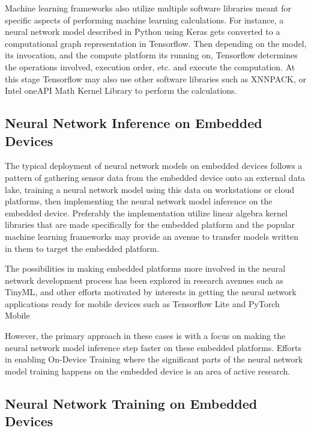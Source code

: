 Machine learning frameworks also utilize multiple software libraries meant for specific aspects of performing machine learning calculations. For instance, a neural network model described in Python using Keras gets converted to a computational graph representation in Tensorflow. Then depending on the model, its invocation, and the compute platform its running on, Tensorflow determines the operations involved, execution order, etc. and execute the computation. At this stage Tensorflow may also use other software libraries such as XNNPACK, or Intel oneAPI Math Kernel Library to perform the calculations.


\subsection{Neural Network Inference on Embedded Devices}

The typical deployment of neural network models on embedded devices follows a pattern of gathering sensor data from the embedded device onto an external data lake, training a neural network model using this data on workstations or cloud platforms, then implementing the neural network model inference on the embedded device. Preferably the implementation utilize linear algebra kernel libraries that are made specifically for the embedded platform and the popular machine learning frameworks may provide an avenue to transfer models written in them to target the embedded platform.

The possibilities in making embedded platforms more involved in the neural network development process has been explored in research avenues such as TinyML\cite{tinyml}, and other efforts motivated by interests in getting the neural network applications ready for mobile devices such as Tensorflow Lite\cite{tfl} and PyTorch Mobile \cite{pytorch-mobile}

However, the primary approach in these cases is with a focus on making the neural network model inference step faster on these embedded platforms. Efforts in enabling On-Device Training where the significant parts of the neural network model training happens on the embedded device is an area of active research.


\subsection{Neural Network Training on Embedded Devices}

